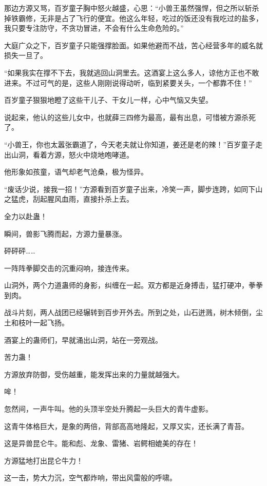 
\begin{this_body}

那边方源又骂，百岁童子胸中怒火越盛，心思：“小兽王虽然强悍，但之所以斩杀掉铁霸修，无非是占了飞行的便宜。他这么年轻，吃过的饭还没有我吃过的盐多，我只要专注防守，不贪功冒进，不会有什么生命危险的。”

大庭广众之下，百岁童子只能强撑脸面。如果他避而不战，苦心经营多年的威名就损失一旦了。

“如果我实在撑不下去，我就逃回山洞里去。这酒宴上这么多人，谅他方正也不敢进来。不过可气的是，这些人刚刚说得动听，临到紧要关头，一个都靠不住！”

百岁童子狠狠地瞪了这些干儿子、干女儿一样，心中气恼又失望。

说起来，他认的这些儿女中，也就薛三四修为最高，最有出息，可惜被方源杀死了。

“小兽王，你也太嚣张霸道了，今天老夫就让你知道，姜还是老的辣！”百岁童子走出山洞，看着方源，怒火中烧地咆哮道。

他形象如孩童，语气却老气沧桑，极为怪异。

“废话少说，接我一招！”方源看到百岁童子出来，冷笑一声，脚步连跨，如同下山之猛虎，刮起腥风血雨，直接扑杀上去。

全力以赴蛊！

瞬间，兽影飞腾而起，方源力量暴涨。

砰砰砰……

一阵阵拳脚交击的沉重闷响，接连传来。

山洞外，两个力道蛊师的身影，纠缠在一起。双方都是近身搏击，猛打硬冲，拳拳到肉。

战斗片刻，两人战团已经辗转到百步开外去。所到之处，山石迸溅，树木倾倒，尘土和枝叶一起飞扬。

酒宴上的蛊师们，早就涌出山洞，站在一旁观战。

苦力蛊！

方源放弃防御，受伤越重，能发挥出来的力量就越强大。

哞！

忽然间，一声牛叫。他的头顶半空处升腾起一头巨大的青牛虚影。

这青牛体格巨大，是象的两倍，背部高高地隆起，又厚又实，还长满了青苔。

这是异兽昆仑牛。能和彪、龙象、雷猪、岩鳄相媲美的存在！

方源猛地打出昆仑牛力！

这一击，势大力沉，空气都炸响，带出风雷般的呼啸。


\end{this_body}

